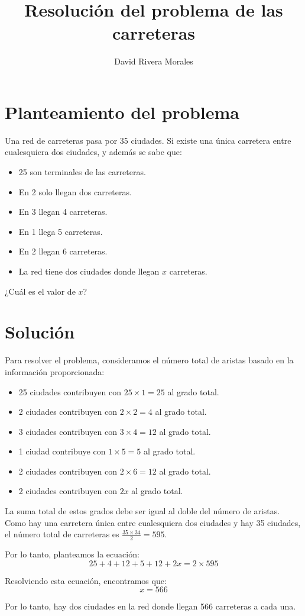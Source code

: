 \documentclass{article}
\begin{document}
\title{Resolución del problema de las carreteras}
\author{David Rivera Morales}
\maketitle

\section{Planteamiento del problema}
Una red de carreteras pasa por 35 ciudades. Si existe una única carretera entre cualesquiera dos ciudades, y además se sabe que:
\begin{itemize}
    \item 25 son terminales de las carreteras.
    \item En 2 solo llegan dos carreteras.
    \item En 3 llegan 4 carreteras.
    \item En 1 llega 5 carreteras.
    \item En 2 llegan 6 carreteras.
    \item La red tiene dos ciudades donde llegan $x$ carreteras.
\end{itemize}
¿Cuál es el valor de $x$?

\section{Solución}
Para resolver el problema, consideramos el número total de aristas basado en la información proporcionada:
\begin{itemize}
    \item 25 ciudades contribuyen con $25 \times 1 = 25$ al grado total.
    \item 2 ciudades contribuyen con $2 \times 2 = 4$ al grado total.
    \item 3 ciudades contribuyen con $3 \times 4 = 12$ al grado total.
    \item 1 ciudad contribuye con $1 \times 5 = 5$ al grado total.
    \item 2 ciudades contribuyen con $2 \times 6 = 12$ al grado total.
    \item 2 ciudades contribuyen con $2x$ al grado total.
\end{itemize}

La suma total de estos grados debe ser igual al doble del número de aristas. Como hay una carretera única entre cualesquiera dos ciudades y hay 35 ciudades, el número total de carreteras es $\frac{35 \times 34}{2} = 595$. 

Por lo tanto, planteamos la ecuación:
\[
25 + 4 + 12 + 5 + 12 + 2x = 2 \times 595
\]

Resolviendo esta ecuación, encontramos que:
\[
x = 566
\]

Por lo tanto, hay dos ciudades en la red donde llegan 566 carreteras a cada una.
\end{document}
